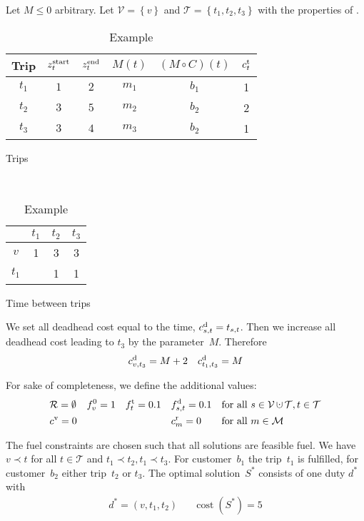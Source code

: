 \begin{example}

Let $M\leq 0$ arbitrary. Let ${\mathcal{V} = \left\{v\right\}}$ and ${\mathcal{T} = \left\{t_1,t_2,t_3\right\}}$ with the properties of . 

\begin{table}[htp]
	\centering
	\begin{subtable}[h]{.6\textwidth}
		\centering
		\begin{tabular}{c|ccccc}
			Trip & $z^{\operatorname{start}}_t$ & $z^{\operatorname{end}}_t$ & $M(t)$ & $\left(M\circ C\right)(t)$ & $c^{\operatorname{t}}_t$ \\
			\hline
			$t_1$ & $1$ & $2$ & $m_1$ & $b_1$ & 1 \\
			$t_2$ & $3$ & $5$ & $m_2$ & $b_2$ & 2 \\
			$t_3$ & $3$ & $4$ & $m_3$ & $b_2$ & 1 \\
		\end{tabular}
		\caption{Trips}
	\end{subtable}
	~
	\begin{subtable}[h]{.3\textwidth}
		\centering
		\begin{tabular}{c|ccc}
			& $t_1$ & $t_2$ & $t_3$ \\
			\hline
			$v$   & 1 & 3 & 3 \\
			$t_1$ &   & 1 & 1 \\
		\end{tabular}
		\caption{Time between trips}
	\end{subtable}
	\caption{Example}
	\label{tab:approximation_example}
\end{table}

We set all deadhead cost equal to the time, \ie ${c^{\operatorname{d}}_{s,t}=t_{s,t}}$. Then we increase all deadhead cost leading to $t_3$ by the parameter~$M$. Therefore
\begin{align*}
	c^{\operatorname{d}}_{v,t_3} = M+2 && c^{\operatorname{d}}_{t_1,t_3} = M
\end{align*}

For sake of completeness, we define the additional values:
\begin{align*}
	& \mathcal{R}=\emptyset && f^0_v=1 && \ft_t=0.1 && \fd_{s,t}=0.1 && \text{for all } s\in\mathcal{V}\cupdot\mathcal{T}, t\in\mathcal{T} \\
	& \cv = 0 &&&&&& \croute_m=0 && \text{for all } m\in\mathcal{M} \\
\end{align*}

The fuel constraints are chosen such that all solutions are feasible \wrt fuel. We have ${v\prec t}$ for all ${t\in\mathcal{T}}$ and ${t_1\prec t_2}, {t_1\prec t_3}$. For customer~$b_1$ the trip~$t_1$ is fulfilled, for customer~$b_2$ either trip~$t_2$ or $t_3$. The optimal solution~$S^*$ consists of one duty $d^*$ with
\begin{align*}
	d^* = \left(v, t_1, t_2\right) && \operatorname{cost}\left(S^*\right) = 5
\end{align*}


\end{example}
